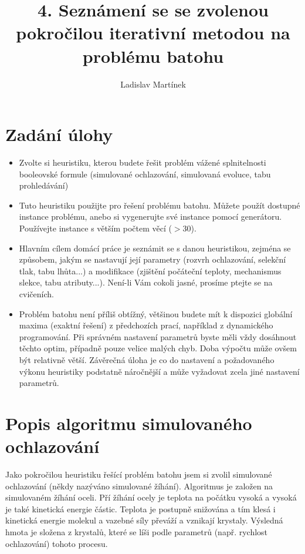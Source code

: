 \documentclass[11pt]{article}
\begin{document}

\title{4. Seznámení se se zvolenou pokročilou iterativní metodou na problému batohu}
\author{Ladislav Martínek}
\date{}
\maketitle
 
\section{Zadání úlohy} 

\begin{itemize}
\item Zvolte si heuristiku, kterou budete řešit problém vážené splnitelnosti booleovské formule (simulované ochlazování, simulovaná evoluce, tabu prohledávání)
\item Tuto heuristiku použijte pro řešení problému batohu. Můžete použít dostupné instance problému, anebo si vygenerujte své instance pomocí generátoru. Používejte instance s větším počtem věcí ($>$30).
\item Hlavním cílem domácí práce je seznámit se s danou heuristikou, zejména se způsobem, jakým se nastavují její parametry (rozvrh ochlazování, selekční tlak, tabu lhůta...) a modifikace (zjištění počáteční teploty, mechanismus slekce, tabu atributy...). Není-li Vám cokoli jasné, prosíme ptejte se na cvičeních.
\item Problém batohu není příliš obtížný, většinou budete mít k dispozici globální maxima (exaktní řešení) z předchozích prací, například z dynamického programování. Při správném nastavení parametrů byste měli vždy dosáhnout těchto optim, případně pouze velice malých chyb. Doba výpočtu může ovšem být relativně větší. Závěrečná úloha je co do nastavení a požadovaného výkonu heuristiky podstatně náročnější a může vyžadovat zcela jiné nastavení parametrů.

\end{itemize}


\section{Popis algoritmu simulovaného ochlazování}\label{kap:1}
Jako pokročilou heuristiku řešící problém batohu jsem si zvolil simulované ochlazování (někdy nazýváno simulované žíhání). Algoritmus je založen na simulovaném žíhání oceli. Pří žíhání ocely je teplota na počátku vysoká a vysoká je také kinetická energie částic. Teplota je postupně snižována a tím klesá i kinetická energie molekul a vazebné síly převáží a vznikají krystaly. Výsledná hmota je složena z krystalů, které se líši podle parametrů (např. rychlost ochlazování) tohoto procesu. 
\end{document}
